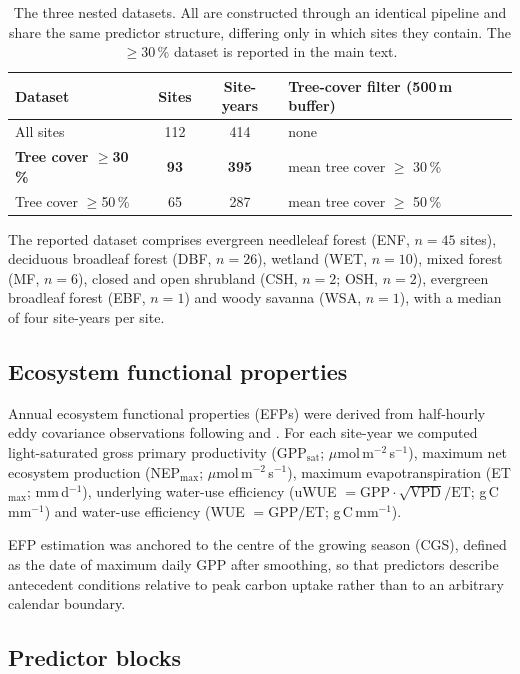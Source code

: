 \documentclass[pdflatex,sn-nature]{sn-jnl}%
\theoremstyle{thmstyleone}%
\theoremstyle{thmstyletwo}%
\theoremstyle{thmstylethree}%
\begin{document}
\begin{table}[h!]
\centering
\small
\begin{tabular}{lccl}
\hline
Dataset & Sites & Site-years & Tree-cover filter (500\,m buffer) \\
\hline
All sites & 112 & 414 & none \\
\textbf{Tree cover $\geq$30\,\%} & \textbf{93} & \textbf{395} & mean tree cover $\geq$ 30\,\% \\
Tree cover $\geq$50\,\% & 65 & 287 & mean tree cover $\geq$ 50\,\% \\
\hline
\end{tabular}
\caption{The three nested datasets. All are constructed through an identical pipeline and share the same predictor structure, differing only in which sites they contain. The $\geq$30\,\% dataset is reported in the main text.}
\label{tab:datasets}
\end{table}

The reported dataset comprises evergreen needleleaf forest (ENF, $n=45$ sites), deciduous broadleaf forest (DBF, $n=26$), wetland (WET, $n=10$), mixed forest (MF, $n=6$), closed and open shrubland (CSH, $n=2$; OSH, $n=2$), evergreen broadleaf forest (EBF, $n=1$) and woody savanna (WSA, $n=1$), with a median of four site-years per site.

\subsection*{Ecosystem functional properties}

Annual ecosystem functional properties (EFPs) were derived from half-hourly eddy covariance observations following \cite{musavi2015imprint} and \cite{migliavacca_three_2021}. For each site-year we computed light-saturated gross primary productivity (GPP$_\mathrm{sat}$; $\mu$mol\,m$^{-2}$\,s$^{-1}$), maximum net ecosystem production (NEP$_\mathrm{max}$; $\mu$mol\,m$^{-2}$\,s$^{-1}$), maximum evapotranspiration (ET$_\mathrm{max}$; mm\,d$^{-1}$), underlying water-use efficiency (uWUE $=\mathrm{GPP}\cdot\sqrt{\mathrm{VPD}}/\mathrm{ET}$; g\,C\,mm$^{-1}$) and water-use efficiency (WUE $=\mathrm{GPP}/\mathrm{ET}$; g\,C\,mm$^{-1}$).

EFP estimation was anchored to the centre of the growing season (CGS), defined as the date of maximum daily GPP after smoothing, so that predictors describe antecedent conditions relative to peak carbon uptake rather than to an arbitrary calendar boundary.

\subsection*{Predictor blocks}
\end{document}
